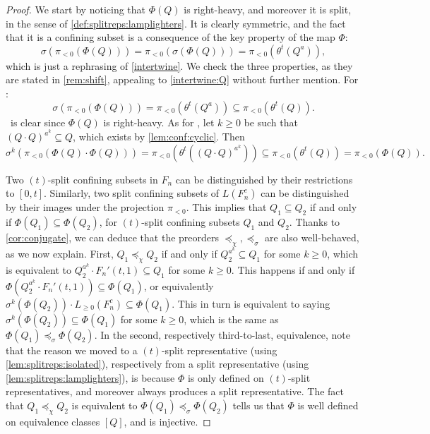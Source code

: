 \documentclass[reqno,12pt]{amsart}\setcounter{tocdepth}{1}
\theoremstyle{definition}
\numberwithin{equation}{section}
\begin{document}
\begin{proof}
We start by noticing that $\Phi(Q)$ is right-heavy, and moreover it is split, in the sense of \cref{def:splitreps:lamplighters}. It is clearly symmetric, and the fact that it is a confining subset is a consequence of the key property of the map $\Phi$:
\begin{equation}
\label{intertwine:Q}
\sigma(\pi_{<0}(\Phi(Q))) = \pi_{<0}(\sigma(\Phi(Q))) = \pi_{<0}(\theta^t(Q^a)),
\end{equation}
which is just a rephrasing of \cref{intertwine}. We check the three properties, as they are stated in \cref{rem:shift}, appealing to \cref{intertwine:Q} without further mention. For \StayInConf:
\[\sigma(\pi_{<0}(\Phi(Q))) = \pi_{<0}(\theta^t(Q^a)) \subseteq \pi_{<0}(\theta^t(Q)).\]
\GetInConf\ is clear since $\Phi(Q)$ is right-heavy. As for \ProdConf, let $k \geq 0$ be such that $(Q \cdot Q)^{a^k} \subseteq Q$, which exists by \cref{lem:conf:cyclic}. Then
\[\sigma^k(\pi_{<0}(\Phi(Q) \cdot \Phi(Q))) = \pi_{<0}(\theta^t((Q \cdot Q)^{a^k})) \subseteq \pi_{<0}(\theta^t(Q))= \pi_{<0}( \Phi(Q)).\]

Two $(t)$-split confining subsets in $F_n$ can be distinguished by their restrictions to $[0, t]$. Similarly, two split confining subsets of $L(F_n^c)$ can be distinguished by their images under the projection $\pi_{<0}$. This implies that $Q_1 \subseteq Q_2$ if and only if $\Phi(Q_1) \subseteq \Phi(Q_2)$, for $(t)$-split confining subsets $Q_1$ and $Q_2$. Thanks to \cref{cor:conjugate}, we can deduce that the preorders $\preceq_\chi, \preceq_\sigma$ are also well-behaved, as we now explain. First, $Q_1 \preceq_\chi Q_2$ if and only if $Q_2^{a^k} \subseteq Q_1$ for some $k\ge 0$, which is equivalent to $Q_2^{a^k} \cdot F_n'(t, 1) \subseteq Q_1$ for some $k\ge 0$. This happens if and only if $\Phi(Q_2^{a^k} \cdot F_n'(t, 1)) \subseteq \Phi(Q_1)$, or equivalently $\sigma^k(\Phi(Q_2))\cdot L_{\geq 0}(F_n^c) \subseteq \Phi(Q_1)$. This in turn is equivalent to saying $\sigma^k(\Phi(Q_2)) \subseteq \Phi(Q_1)$ for some $k\ge 0$, which is the same as $\Phi(Q_1) \preceq_\sigma \Phi(Q_2)$. In the second, respectively third-to-last, equivalence, note that the reason we moved to a $(t)$-split representative (using \cref{lem:splitreps:isolated}), respectively from a split representative (using \cref{lem:splitreps:lamplighters}), is because $\Phi$ is only defined on $(t)$-split representatives, and moreover always produces a split representative. The fact that $Q_1\preceq_\chi Q_2$ is equivalent to $\Phi(Q_1)\preceq_\sigma \Phi(Q_2)$ tells us that $\Phi$ is well defined on equivalence classes $[Q]$, and is injective.


\end{proof}
\end{document}
